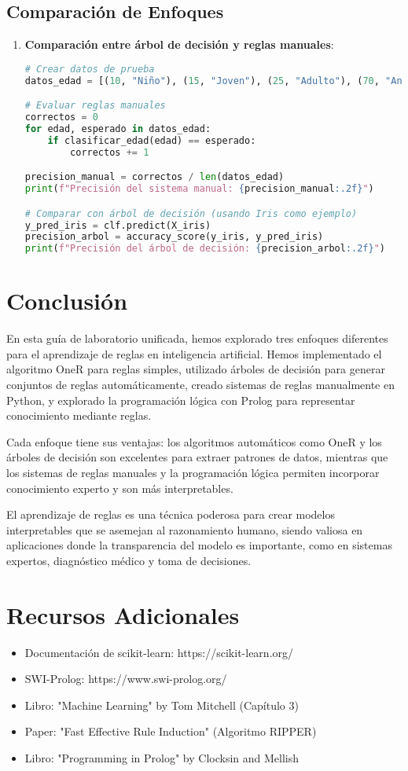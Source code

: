 \documentclass[a4paper,12pt]{article}
\begin{document}
\subsection{Comparación de Enfoques}
\begin{enumerate}
    \item \textbf{Comparación entre árbol de decisión y reglas manuales}:
    \begin{lstlisting}[language=Python]
# Crear datos de prueba
datos_edad = [(10, "Niño"), (15, "Joven"), (25, "Adulto"), (70, "Anciano")]

# Evaluar reglas manuales
correctos = 0
for edad, esperado in datos_edad:
    if clasificar_edad(edad) == esperado:
        correctos += 1

precision_manual = correctos / len(datos_edad)
print(f"Precisión del sistema manual: {precision_manual:.2f}")

# Comparar con árbol de decisión (usando Iris como ejemplo)
y_pred_iris = clf.predict(X_iris)
precision_arbol = accuracy_score(y_iris, y_pred_iris)
print(f"Precisión del árbol de decisión: {precision_arbol:.2f}")
    \end{lstlisting}
\end{enumerate}

\section{Conclusión}
En esta guía de laboratorio unificada, hemos explorado tres enfoques diferentes para el aprendizaje de reglas en inteligencia artificial. Hemos implementado el algoritmo OneR para reglas simples, utilizado árboles de decisión para generar conjuntos de reglas automáticamente, creado sistemas de reglas manualmente en Python, y explorado la programación lógica con Prolog para representar conocimiento mediante reglas.

Cada enfoque tiene sus ventajas: los algoritmos automáticos como OneR y los árboles de decisión son excelentes para extraer patrones de datos, mientras que los sistemas de reglas manuales y la programación lógica permiten incorporar conocimiento experto y son más interpretables.

El aprendizaje de reglas es una técnica poderosa para crear modelos interpretables que se asemejan al razonamiento humano, siendo valiosa en aplicaciones donde la transparencia del modelo es importante, como en sistemas expertos, diagnóstico médico y toma de decisiones.

\section{Recursos Adicionales}
\begin{itemize}
    \item Documentación de scikit-learn: https://scikit-learn.org/
    \item SWI-Prolog: https://www.swi-prolog.org/
    \item Libro: "Machine Learning" by Tom Mitchell (Capítulo 3)
    \item Paper: "Fast Effective Rule Induction" (Algoritmo RIPPER)
    \item Libro: "Programming in Prolog" by Clocksin and Mellish
\end{itemize}
\end{document}
